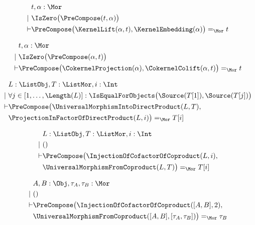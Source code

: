 \begin{sequent}
\begin{align*}
  &t, \alpha:\Mor\\
  |~ &\IsZero\big( \PreCompose( t, \alpha ) \big)\\
  \vdash &\PreCompose\big(\KernelLift( \alpha , t ), \KernelEmbedding( \alpha ) \big) =_{\Mor} t
\end{align*}
\end{sequent}

\begin{sequent}
\begin{align*}
  &t, \alpha:\Mor\\
  |~  &\IsZero\big(\PreCompose(\alpha, t)\big)\\
  \vdash &\PreCompose\big(\CokernelProjection( \alpha ), \CokernelColift( \alpha, t )\big) =_{\Mor} t
\end{align*}
\end{sequent}

\begin{sequent}
\begin{align*}
  &L:\ListObj, T:\ListMor, i:\Int\\
  | ~& \forall j \in [ 1, \dots, \Length( L ) ]: \IsEqualForObjects\big(\Source( T[1] ), \Source( T[j] ) \big) \\
  \vdash &\PreCompose\big(\UniversalMorphismIntoDirectProduct( L, T ), \\
  &\ProjectionInFactorOfDirectProduct( L, i ) \big) =_{\Mor} T[i]
\end{align*}
\end{sequent}

\begin{sequent}
\begin{align*}
  &L:\ListObj, T:\ListMor, i:\Int\\
  |~ &()\\
  \vdash &\PreCompose\big(\InjectionOfCofactorOfCoproduct( L, i ),\\
  &\UniversalMorphismFromCoproduct( L, T ) \big) =_{\Mor} T[i]
\end{align*}
\end{sequent}

\begin{sequent}
\begin{align*}
  &A, B:\Obj, \tau_A, \tau_B:\Mor \\
  |~ &()\\
  \vdash &\PreCompose\big(\InjectionOfCofactorOfCoproduct( [A, B], 2 ),\\
  &\UniversalMorphismFromCoproduct( [A,B], [\tau_A, \tau_B] ) \big) =_{\Mor} \tau_B 
\end{align*}
\end{sequent}


